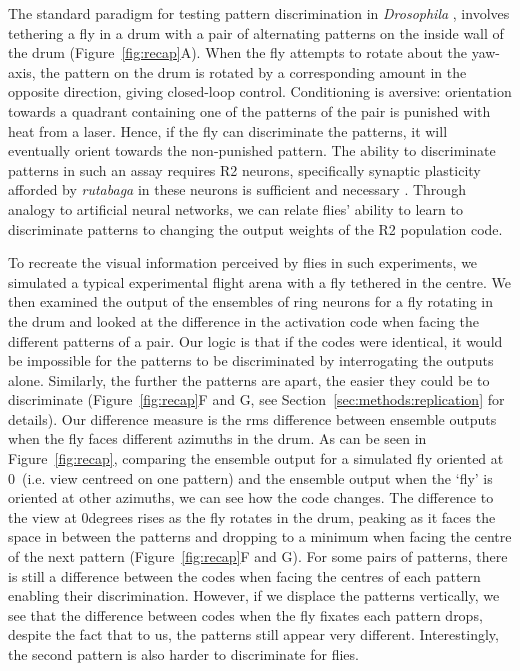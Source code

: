 \documentclass[10pt]{article}
\begin{document}
The standard paradigm for testing pattern discrimination in \emph{Drosophila} \cite{Dill1993,Ernst1999,Liu2006,Pan2009}, involves tethering a fly in a drum with a pair of alternating patterns on the inside wall of the drum (Figure~\ref{fig:recap}A).
When the fly attempts to rotate about the yaw-axis, the pattern on the drum is rotated by a corresponding amount in the opposite direction, giving closed-loop control.
Conditioning is aversive: orientation towards a quadrant containing one of the patterns of the pair is punished with heat from a laser.
Hence, if the fly can discriminate the patterns, it will eventually orient towards the non-punished pattern. The ability to discriminate patterns in such an assay requires R2 neurons, specifically synaptic plasticity afforded by \emph{rutabaga} in these neurons is sufficient and necessary \cite{Ernst1999,Liu2006,Wang2008,Pan2009}. Through analogy to artificial neural networks, we can relate flies' ability to learn to discriminate patterns to changing the output weights of the R2 population code. 

To recreate the visual information perceived by flies in such experiments, we simulated a typical experimental flight arena with a fly tethered in the centre. We then examined the output of the ensembles of ring neurons for a fly rotating in the drum and looked at the difference in the activation code when facing the different patterns of a pair. Our logic is that if the codes were identical, it would be impossible for the patterns to be discriminated by interrogating the outputs alone. Similarly, the further the patterns are apart, the easier they could be to discriminate (Figure~\ref{fig:recap}F and G, see Section~\ref{sec:methods:replication} for details). Our difference measure is the \ac{rms} difference between ensemble outputs when the fly faces different azimuths in the drum. As can be seen in Figure~\ref{fig:recap}, comparing the ensemble output for a simulated fly oriented at 0\degree\ (i.e. view centreed on one pattern) and the ensemble output when the `fly' is oriented at other azimuths, we can see how the code changes. The difference to the view at 0degrees rises as the fly rotates in the drum, peaking as it faces the space in between the patterns and dropping to a minimum when facing the centre of the next pattern (Figure~\ref{fig:recap}F and G). For some pairs of patterns, there is still a difference between the codes when facing the centres of each pattern enabling their discrimination. However, if we displace the patterns vertically, we see that the difference between codes when the fly fixates each pattern drops, despite the fact that to us, the patterns still appear very different. Interestingly, the second pattern is also harder to discriminate for flies.
\end{document}

